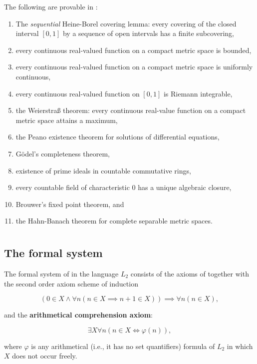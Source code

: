 \documentclass[../main.tex]{memoir}
\begin{document}
\begin{theorem}
  The following are provable in \wkl:

  \begin{enumerate}
  \item The \textit{sequential} Heine-Borel covering lemma: every covering of the closed interval $[0, 1]$ by a sequence of open intervals has a finite subcovering,
  \item every continuous real-valued function on a compact metric space is bounded,
  \item every continuous real-valued function on a compact metric space is uniformly continuous,
  \item every continuous real-valued function on $[0, 1]$ is Riemann integrable,
  \item the Weierstra{\ss} theorem: every continuous real-value function on a compact metric space attains a maximum,
  \item the Peano existence theorem for solutions of differential equations,
  \item Gödel's completeness theorem,
  \item existence of prime ideals in countable commutative rings,
  \item every countable field of characteristic $0$ has a unique algebraic closure,
  \item Brouwer's fixed point theorem, and
  \item the Hahn-Banach theorem for complete separable metric spaces.
  \end{enumerate}
\end{theorem}

\section{\aca}

\subsection{The formal system}

\begin{definition}
  The formal system of \aca in the language $L_2$ consists of the axioms of \rca together with the second order axiom scheme of induction

  \[ (0 \in X \land \forall n (n \in X \implies n + 1 \in X)) \implies \forall n (n \in X), \]

  and the \textbf{arithmetical comprehension axiom}:

  \[ \exists X \forall n (n \in X \iff \varphi(n)), \]

  where $\varphi$ is any arithmetical (i.e., it has no set quantifiers) formula of $L_2$ in which $X$ does not occur freely.
\end{definition}
\end{document}
